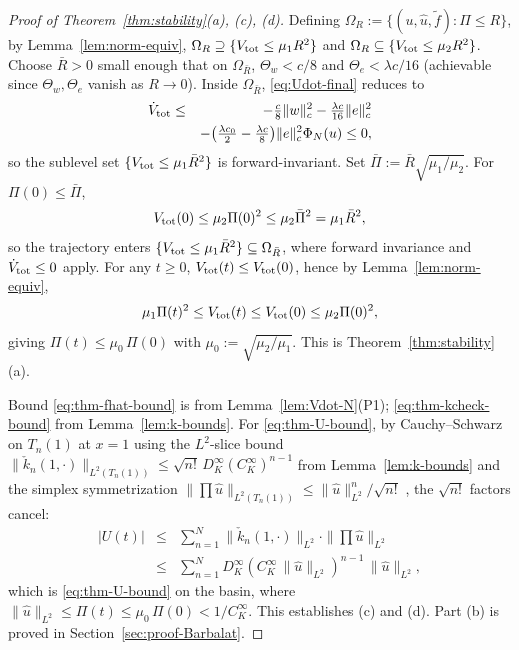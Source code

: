\documentclass[journal,twoside,web]{ieeecolor}
\begin{document}
\begin{proof}[Proof of Theorem~\ref{thm:stability}(a), (c), (d)]
Defining $\Omega_R:=\{(u,\hat u,\tilde f):\Pi\le R\}$, by Lemma~\ref{lem:norm-equiv}, $\Omega_R\supseteq\{V_{\rm tot}\le\mu_1 R^2\}$ and $\Omega_R\subseteq\{V_{\rm tot}\le\mu_2 R^2\}$. Choose $\bar R>0$ small enough that on $\Omega_{\bar R}$, $\Theta_w<c/8$ and $\Theta_e<\lambda c/16$ (achievable since $\Theta_w,\Theta_e$ vanish as $R\to 0$). Inside $\Omega_{\bar R}$, \eqref{eq:Udot-final} reduces to
\begin{eqnarray}
\dot V_{\rm tot} &\le& -\tfrac{c}{8}\|w\|_c^2-\tfrac{\lambda c}{16}\|e\|_c^2 \nonumber\\
&& -\bigl(\tfrac{\lambda c_0}{2}-\tfrac{\lambda c}{8}\bigr)\|e\|_c^2\Phi_N(u)\le 0, \label{eq:Udot-clean}
\end{eqnarray}
so the sublevel set $\{V_{\rm tot}\le\mu_1\bar R^2\}$ is forward-invariant. Set $\bar\Pi:=\bar R\sqrt{\mu_1/\mu_2}$. For $\Pi(0)\le\bar\Pi$,
\begin{equation}\label{eq:U0-bound}
V_{\rm tot}(0)\le\mu_2\Pi(0)^2\le\mu_2\bar\Pi^2=\mu_1\bar R^2,
\end{equation}
so the trajectory enters $\{V_{\rm tot}\le\mu_1\bar R^2\}\subseteq\Omega_{\bar R}$, where forward invariance and $\dot V_{\rm tot}\le 0$ apply. For any $t\ge 0$, $V_{\rm tot}(t)\le V_{\rm tot}(0)$, hence by Lemma~\ref{lem:norm-equiv},
\begin{equation}\label{eq:Pi-stability}
\mu_1\Pi(t)^2\le V_{\rm tot}(t)\le V_{\rm tot}(0)\le\mu_2\Pi(0)^2,
\end{equation}
giving $\Pi(t)\le\mu_0\,\Pi(0)$ with $\mu_0:=\sqrt{\mu_2/\mu_1}$. This is Theorem~\ref{thm:stability}(a).

Bound \eqref{eq:thm-fhat-bound} is from Lemma~\ref{lem:Vdot-N}(P1); \eqref{eq:thm-kcheck-bound} from Lemma~\ref{lem:k-bounds}. For \eqref{eq:thm-U-bound}, by Cauchy--Schwarz on $T_n(1)$ at $x=1$ using the $L^2$-slice bound $\|\check k_n(1,\cdot)\|_{L^2(T_n(1))}\le \sqrt{n!}\,D_K^\infty(C_K^\infty)^{n-1}$ from Lemma~\ref{lem:k-bounds} and the simplex symmetrization $\|\prod\hat u\|_{L^2(T_n(1))}\le\|\hat u\|^n_{L^2}/\sqrt{n!}$ \cite{HV2}, the $\sqrt{n!}$ factors cancel:
\begin{eqnarray}
|U(t)| &\le& \sum_{n=1}^N\|\check k_n(1,\cdot)\|_{L^2}\cdot\|\textstyle\prod\hat u\|_{L^2} \nonumber\\
&\le& \sum_{n=1}^N D_K^\infty(C_K^\infty\,\|\hat u\|_{L^2})^{n-1}\,\|\hat u\|_{L^2}, \label{eq:U-bound-derivation}
\end{eqnarray}
which is \eqref{eq:thm-U-bound} on the basin, where $\|\hat u\|_{L^2}\le\Pi(t)\le\mu_0\,\Pi(0)<1/C_K^\infty$. This establishes (c) and (d). Part (b) is proved in Section~\ref{sec:proof-Barbalat}.
\end{proof}
\end{document}
